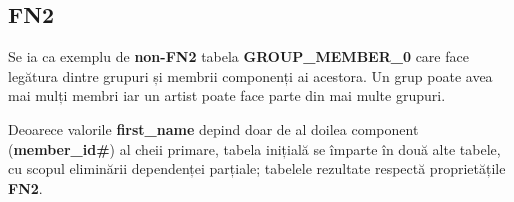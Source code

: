 \documentclass[a4paper, oneside, 12pt]{article}
\newcommand{\rowstyle}[1]{\gdef\currentrowstyle{#1}%
  #1\ignorespaces
}
\begin{document}
\begin{table}[H]
\centering
\caption*{Tabela \textbf{ALBUMS\_2}:}
\end{table}

\subsection{FN2}

Se ia ca exemplu de \textbf{non-FN2} tabela \textbf{GROUP\_MEMBER\_0} care face legătura dintre grupuri și membrii componenți ai acestora. Un grup poate avea mai mulți membri iar un artist poate face parte din mai multe grupuri.


\begin{table}[H]
\centering
\caption*{Tabela \textbf{GROUP\_MEMBER\_0}:}
\end{table}

Deoarece valorile \textbf{first\_name} depind doar de al doilea component
(\textbf{member\_id\#}) al cheii primare, tabela inițială se împarte în două alte tabele,
cu scopul eliminării dependenței parțiale; tabelele rezultate respectă proprietățile \textbf{FN2}.

\begin{table}[H]
\centering
\caption*{Tabela \textbf{GROUP\_MEMBER\_1}:}
\end{table}
\end{document}
